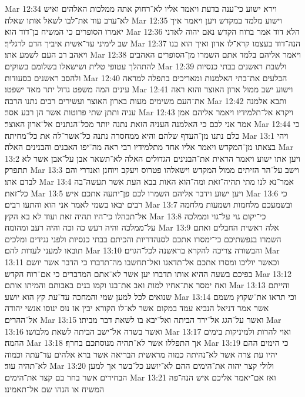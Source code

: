 Mar 12:34  וירא ישוע כי־ענה בדעת ויאמר אליו לא־רחוק אתה ממלכות האלהים ואיש לא־ערב עוד את־לבו לשאל אותו שאלה׃
Mar 12:35  וישוע מלמד במקדש ויען ויאמר איך יאמרו הסופרים כי המשיח בן־דוד הוא׃
Mar 12:36  הלא דוד אמר ברוח הקדש נאם יהוה לאדני שב לימיני עד־אשית איביך הדם לרגליך׃
Mar 12:37  הנה־דוד בעצמו קרא־לו אדון ואיך הוא בנו ויאהב רב העם לשמע אתו׃
Mar 12:38  ויאמר אליהם בלמד אתם השמרו מן־הסופרים האהבים להתהלך עטופי טלית ושישאלו בשלומם בשוקים׃
Mar 12:39  ולשבת ראשנים בבתי כנסיות ולהסב ראשנים בסעודות׃
Mar 12:40  הבלעים את־בתי האלמנות ומאריכים בתפלה למראה עינים המה משפט גדול יתר מאד ישפטו׃
Mar 12:41  וישוע ישב ממול ארון האוצר והוא ראה את־העם משימים מעות בארון האוצר ועשירים רבים נתנו הרבה׃
Mar 12:42  ותבא אלמנה עניה ותתן שתי פרוטות אשר הן רבע אסר׃
Mar 12:43  ויקרא אל־תלמידיו ויאמר אליהם אמן אמר אני לכם כי האלמנה העניה הזאת נתנה יותר מכל־הנתנים אל־ארון האוצר׃
Mar 12:44  כי כלם נתנו מן־העדף שלהם והיא ממחסרה נתנה כל־אשר־לה את כל־מחיתה׃
Mar 13:1  ויהי בצאתו מן־המקדש ויאמר אליו אחד מתלמידיו רבי ראה מה־יפו האבנים והבנינים האלה׃
Mar 13:2  ויען אתו ישוע ויאמר הראית את־הבנינים הגדולים האלה לא־תשאר אבן על־אבן אשר לא תתפרק׃
Mar 13:3  וישב על־הר הזיתים ממול המקדש וישאלהו פטרוס ויעקב ויוחנן ואנדרי והם לבדם אתו׃
Mar 13:4  אמר־נא לנו מתי תהיה־זאת ומה־הוא האות בבא העת אשר תעשה־בה כל־זאת׃
Mar 13:5  ויען ישוע וידבר אליהם השמרו לכם פן־יתעה אתכם איש׃
Mar 13:6  כי רבים יבאו בשמי לאמר אני הוא והתעו רבים׃
Mar 13:7  ובשמעכם מלחמות ושמעות מלחמה אל־תבהלו כי־היו תהיה זאת ועוד לא בא הקץ׃
Mar 13:8  כי־יקום גוי על־גוי וממלכה על־ממלכה והיה רעש כה וכה והיה רעב ומהומה׃
Mar 13:9  אלה ראשית החבלים ואתם השמרו בנפשתיכם כי־ימסרו אתכם לסנהדריות והכיתם בבתי כנסיות ולפני נגידים ומלכים תובאו למעני לעדות להם׃
Mar 13:10  והבשורה צריכה להקרא בראשנה לכל־הגוים׃
Mar 13:11  וכאשר יוליכו ומסרו אתכם אל־תדאגו ואל־תחשבו מה־תדברו כי הדבר אשר יושם בפיכם בשעה ההיא אותו תדברו יען אשר לא־אתם המדברים כי אם־רוח הקדש׃
Mar 13:12  ואח ימסר את־אחיו למות ואב את־בנו וקמו בנים באבותם והמיתו אותם׃
Mar 13:13  והייתם שנואים לכל למען שמי והמחכה עד־עת קץ הוא יושע׃
Mar 13:14  וכי תראו את־שקוץ משמם אשר אמר דניאל הנביא עמד במקום אשר לא־לו הקורא יבין אז נוס ינוסו אנשי יהודה אל־ההרים׃
Mar 13:15  ואשר על־הגג אל־ירד הביתה ואל־יבא בו לשאת דבר מביתו׃
Mar 13:16  ואשר בשדה אל־ישב הביתה לשאת מלבושו׃
Mar 13:17  ואוי להרות ולמיניקות בימים ההמה׃
Mar 13:18  אך התפללו אשר לא־תהיה מנוסתכם בחרף׃
Mar 13:19  כי הימים ההם יהיו עת צרה אשר לא־נהיתה כמוה מראשית הבריאה אשר ברא אלהים עד־עתה וכמוה לא־תהיה עוד׃
Mar 13:20  ולולי קצר יהוה את־הימים ההם לא־יושע כל־בשר אך למען הבחירים אשר בחר בם קצר את־הימים׃
Mar 13:21  ואז אם־יאמר אליכם איש הנה־פה המשיח או הנהו שם אל־תאמינו׃
